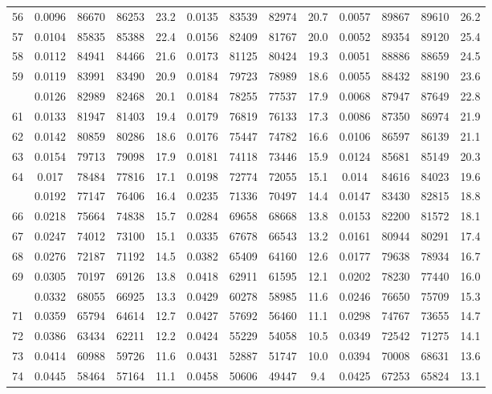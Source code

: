 \documentclass[
  14pt,
]{article}
\begin{document}
\begin{longtable}[t]{lcccccccccccc}
56 & 0.0096 & 86670 & 86253 & 23.2 & 0.0135 & 83539 & 82974 & 20.7 & 0.0057 & 89867 & 89610 & 26.2\\
57 & 0.0104 & 85835 & 85388 & 22.4 & 0.0156 & 82409 & 81767 & 20.0 & 0.0052 & 89354 & 89120 & 25.4\\
58 & 0.0112 & 84941 & 84466 & 21.6 & 0.0173 & 81125 & 80424 & 19.3 & 0.0051 & 88886 & 88659 & 24.5\\
59 & 0.0119 & 83991 & 83490 & 20.9 & 0.0184 & 79723 & 78989 & 18.6 & 0.0055 & 88432 & 88190 & 23.6\\
\addlinespace
60 & 0.0126 & 82989 & 82468 & 20.1 & 0.0184 & 78255 & 77537 & 17.9 & 0.0068 & 87947 & 87649 & 22.8\\
61 & 0.0133 & 81947 & 81403 & 19.4 & 0.0179 & 76819 & 76133 & 17.3 & 0.0086 & 87350 & 86974 & 21.9\\
62 & 0.0142 & 80859 & 80286 & 18.6 & 0.0176 & 75447 & 74782 & 16.6 & 0.0106 & 86597 & 86139 & 21.1\\
63 & 0.0154 & 79713 & 79098 & 17.9 & 0.0181 & 74118 & 73446 & 15.9 & 0.0124 & 85681 & 85149 & 20.3\\
64 & 0.017 & 78484 & 77816 & 17.1 & 0.0198 & 72774 & 72055 & 15.1 & 0.014 & 84616 & 84023 & 19.6\\
\addlinespace
65 & 0.0192 & 77147 & 76406 & 16.4 & 0.0235 & 71336 & 70497 & 14.4 & 0.0147 & 83430 & 82815 & 18.8\\
66 & 0.0218 & 75664 & 74838 & 15.7 & 0.0284 & 69658 & 68668 & 13.8 & 0.0153 & 82200 & 81572 & 18.1\\
67 & 0.0247 & 74012 & 73100 & 15.1 & 0.0335 & 67678 & 66543 & 13.2 & 0.0161 & 80944 & 80291 & 17.4\\
68 & 0.0276 & 72187 & 71192 & 14.5 & 0.0382 & 65409 & 64160 & 12.6 & 0.0177 & 79638 & 78934 & 16.7\\
69 & 0.0305 & 70197 & 69126 & 13.8 & 0.0418 & 62911 & 61595 & 12.1 & 0.0202 & 78230 & 77440 & 16.0\\
\addlinespace
70 & 0.0332 & 68055 & 66925 & 13.3 & 0.0429 & 60278 & 58985 & 11.6 & 0.0246 & 76650 & 75709 & 15.3\\
71 & 0.0359 & 65794 & 64614 & 12.7 & 0.0427 & 57692 & 56460 & 11.1 & 0.0298 & 74767 & 73655 & 14.7\\
72 & 0.0386 & 63434 & 62211 & 12.2 & 0.0424 & 55229 & 54058 & 10.5 & 0.0349 & 72542 & 71275 & 14.1\\
73 & 0.0414 & 60988 & 59726 & 11.6 & 0.0431 & 52887 & 51747 & 10.0 & 0.0394 & 70008 & 68631 & 13.6\\
74 & 0.0445 & 58464 & 57164 & 11.1 & 0.0458 & 50606 & 49447 & 9.4 & 0.0425 & 67253 & 65824 & 13.1\\

\end{longtable}
\end{document}
